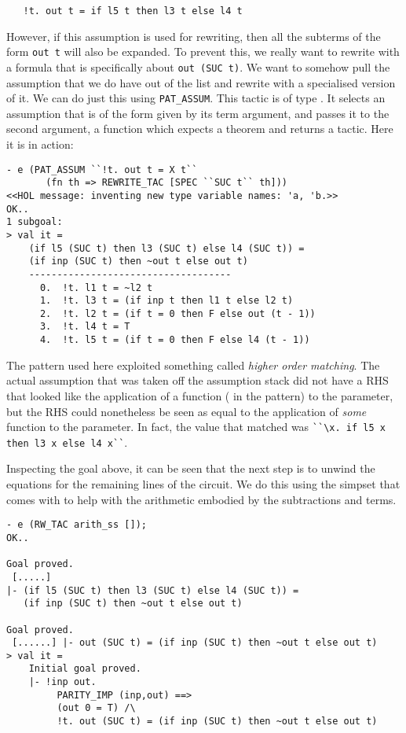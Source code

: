{\small\begin{verbatim}
   !t. out t = if l5 t then l3 t else l4 t
\end{verbatim}}

    However, if this assumption is used for rewriting, then all the
    subterms of the form {\small\verb|out t|} will also be expanded.
    To prevent this, we really want to rewrite with a formula that is
    specifically about {\small\verb|out (SUC t)|}.  We want to somehow
    pull the assumption that we do have out of the list and rewrite
    with a specialised version of it.  We can do just this using
    {\small\verb|PAT_ASSUM|}.  This tactic is of type .  It selects an assumption that is of the form given
    by its term argument, and passes it to the second argument, a
    function which expects a theorem and returns a tactic.  Here it is
    in action:

\begin{session}
\begin{verbatim}
- e (PAT_ASSUM ``!t. out t = X t``
       (fn th => REWRITE_TAC [SPEC ``SUC t`` th]))
<<HOL message: inventing new type variable names: 'a, 'b.>>
OK..
1 subgoal:
> val it =
    (if l5 (SUC t) then l3 (SUC t) else l4 (SUC t)) =
    (if inp (SUC t) then ~out t else out t)
    ------------------------------------
      0.  !t. l1 t = ~l2 t
      1.  !t. l3 t = (if inp t then l1 t else l2 t)
      2.  !t. l2 t = (if t = 0 then F else out (t - 1))
      3.  !t. l4 t = T
      4.  !t. l5 t = (if t = 0 then F else l4 (t - 1))
\end{verbatim}
\end{session}
The pattern used here exploited something called \emph{higher order
  matching}. The actual assumption that was taken off the assumption
stack did not have a RHS that looked like the application of a
function ( in the pattern) to the  parameter, but the RHS
could nonetheless be seen as equal to the application of \emph{some}
function to the  parameter.  In fact, the value that matched
 was {\small\verb|``\x. if l5 x then l3 x else l4 x``|}.

Inspecting the goal above, it can be seen that the next step is to
unwind the equations for the remaining lines of the circuit.  We do
this using the  simpset that comes with  to
help with the arithmetic embodied by the subtractions and 
terms.

\begin{session}
\begin{verbatim}
- e (RW_TAC arith_ss []);
OK..

Goal proved.
 [.....]
|- (if l5 (SUC t) then l3 (SUC t) else l4 (SUC t)) =
   (if inp (SUC t) then ~out t else out t)

Goal proved.
 [......] |- out (SUC t) = (if inp (SUC t) then ~out t else out t)
> val it =
    Initial goal proved.
    |- !inp out.
         PARITY_IMP (inp,out) ==>
         (out 0 = T) /\
         !t. out (SUC t) = (if inp (SUC t) then ~out t else out t)
\end{verbatim}
\end{session}

